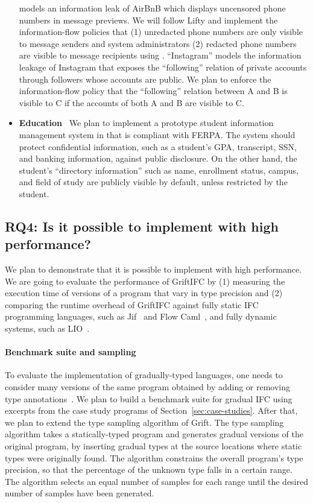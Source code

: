 \begin{itemize}
  models an information leak of AirBnB which displays uncensored phone numbers
  in message previews. We will follow Lifty and implement the information-flow
  policies that (1) unredacted phone numbers are only visible to message
  senders and system administrators (2) redacted phone numbers are
  visible to message recipients using \SurfacePlus. ``Instagram'' models the
  information leakage of Instagram that exposes the ``following'' relation of
  private accounts through followers whose accounts are public. We plan to
  enforce the information-flow policy that the ``following'' relation between A
  and B is visible to C if the accounts of both A and B are visible to C.
\item[] \textbf{Education}~ We plan to implement a prototype student information
  management system in \SurfacePlus that is compliant with FERPA. The system
  should protect confidential information, such as a student's GPA, transcript,
  SSN, and banking information, against public disclosure. On the other hand,
  the student's ``directory information'' such as name, enrollment status,
  campus, and field of study are publicly visible by default, unless restricted
  by the student.
\end{itemize}

\subsection{RQ4: Is it possible to implement \SurfacePlus with high
        performance?}

We plan to demonstrate that it is possible to implement \SurfacePlus with high
performance. We are going to evaluate the performance of GriftIFC by (1)
measuring the execution time of versions of a program that vary in type
precision and (2) comparing the runtime overhead of GriftIFC against fully
static IFC programming languages, such as Jif~\parencite{Myers:2006aa} and Flow
Caml~\parencite{simonet-flowcaml-manual}, and fully dynamic systems, such as
LIO~\parencite{STEFAN:2017ta}.

\paragraph{Benchmark suite and sampling} To evaluate the implementation of
gradually-typed languages, one needs to consider many versions of the same
program obtained by adding or removing type annotations~\parencite{Takikawa:2016aa}.
We plan to build a benchmark suite for gradual IFC using excerpts from the case
study programs of Section~\ref{sec:case-studies}.
After that, we plan to extend the type sampling algorithm of Grift. The type
sampling algorithm takes a statically-typed program and generates gradual
versions of the original program, by inserting gradual types at the source
locations where static types were originally found. The algorithm constrains the
overall program’s type precision, so that the percentage of the unknown type
falls in a certain range. The algorithm selects an equal number of samples for
each range until the desired number of samples have been generated.

